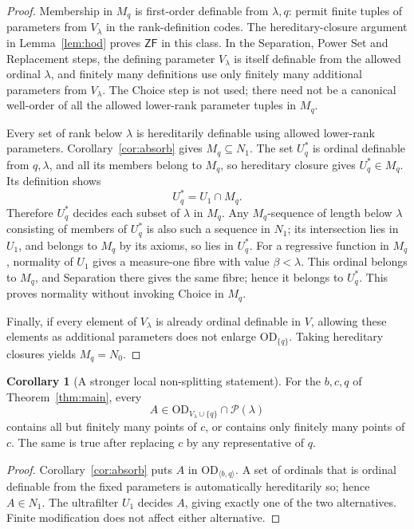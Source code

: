 \documentclass[11pt,letterpaper]{article}
\theoremstyle{definition}
\newtheorem{corollary}[definition]{Corollary}
\newcommand{\ZF}{\mathsf{ZF}}
\newcommand{\OD}{\mathrm{OD}}
\newcommand{\Pow}{\mathcal P}
\newcommand{\ODpar}[2]{\OD_{\langle #1,#2\rangle}}
\begin{document}
\begin{proof}
Membership in $M_q$ is first-order definable from $\lambda,q$: permit finite tuples of parameters from $V_\lambda$ in the rank-definition codes. The hereditary-closure argument in Lemma~\ref{lem:hod} proves $\ZF$ in this class. In the Separation, Power Set and Replacement steps, the defining parameter $V_\lambda$ is itself definable from the allowed ordinal $\lambda$, and finitely many definitions use only finitely many additional parameters from $V_\lambda$. The Choice step is not used; there need not be a canonical well-order of all the allowed lower-rank parameter tuples in $M_q$.

Every set of rank below $\lambda$ is hereditarily definable using allowed lower-rank parameters. Corollary~\ref{cor:absorb} gives $M_q\subseteq N_1$. The set $U_q^*$ is ordinal definable from $q,\lambda$, and all its members belong to $M_q$, so hereditary closure gives $U_q^*\in M_q$. Its definition shows
\[
                             U_q^*=U_1\cap M_q.
\]
Therefore $U_q^*$ decides each subset of $\lambda$ in $M_q$. Any $M_q$-sequence of length below $\lambda$ consisting of members of $U_q^*$ is also such a sequence in $N_1$; its intersection lies in $U_1$, and belongs to $M_q$ by its axioms, so lies in $U_q^*$. For a regressive function in $M_q$, normality of $U_1$ gives a measure-one fibre with value $\beta<\lambda$. This ordinal belongs to $M_q$, and Separation there gives the same fibre; hence it belongs to $U_q^*$. This proves normality without invoking Choice in $M_q$.

Finally, if every element of $V_\lambda$ is already ordinal definable in $V$, allowing these elements as additional parameters does not enlarge $\OD_{\{q\}}$. Taking hereditary closures yields $M_q=N_0$.
\end{proof}

\begin{corollary}[A stronger local non-splitting statement]\label{cor:nonsplitq}
For the $b,c,q$ of Theorem~\ref{thm:main}, every
\[
                  A\in\OD_{V_\lambda\cup\{q\}}\cap\Pow(\lambda)
\]
contains all but finitely many points of $c$, or contains only finitely many points of $c$. The same is true after replacing $c$ by any representative of $q$.
\end{corollary}

\begin{proof}
Corollary~\ref{cor:absorb} puts $A$ in $\ODpar bq$. A set of ordinals that is ordinal definable from the fixed parameters is automatically hereditarily so; hence $A\in N_1$. The ultrafilter $U_1$ decides $A$, giving exactly one of the two alternatives. Finite modification does not affect either alternative.
\end{proof}
\end{document}
